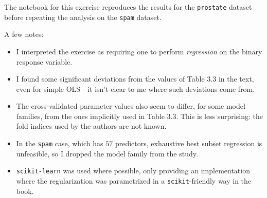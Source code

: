 

\seecode

The notebook for this exercise reproduces the results for the \texttt{prostate}
dataset before repeating the analysis on the \texttt{spam} dataset.

A few notes:

\begin{itemize}
    \item I interpreted the exercise as requiring one to perform
      \textit{regression} on the binary response variable.
    \item I found some significant deviations from the values
      of Table 3.3 in the text, even for simple OLS - it isn't clear
      to me where such deviations come from.
    \item The cross-validated parameter values also seem to differ, for
      some model families, from the ones implicitly used in Table 3.3.
      This is less surprising: the fold indices used by the authors
      are not known.
    \item In the \texttt{spam} case, which has $57$ predictors, exhaustive
      best subset regression is unfeasible, so I dropped the model
      family from the study.
    \item \texttt{scikit-learn} was used where possible, only providing
      an implementation where the regularization was parametrized in
      a \texttt{scikit}-friendly way in the book.
\end{itemize}

